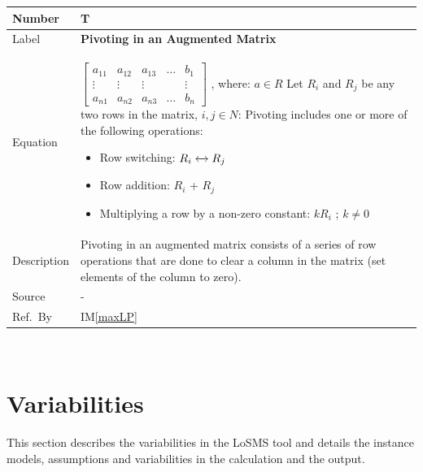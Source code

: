 \documentclass[12pt]{article}
\newcommand{\colAwidth}{0.13\textwidth}
\newcommand{\colBwidth}{0.82\textwidth}
\newcounter{theorynum} %
\newcommand{\iref}[1]{IM\ref{#1}}
\newcommand{\famname}{LoSMS} %
\begin{document}
\noindent
\begin{minipage}{\textwidth}
	\renewcommand*{\arraystretch}{1.5}
	\begin{tabular}{| p{\colAwidth} | p{\colBwidth}|}
		\hline
		\rowcolor[gray]{0.9}
		Number& T{theorynum}\thetheorynum \label{T_pivoting}\\
		\hline
		Label&\bf Pivoting in an Augmented Matrix\\
		\hline
		Equation&$\begin{bmatrix}
		a_{11} & a_{12} & a_{13} & \dots & b_{1}\\
		\vdots & \vdots & \vdots & &\vdots\\
		a_{n1} & a_{n2} & a_{n3} & \dots & b_{n}	
		\end{bmatrix}$ , where: $a \in R$ \newline \newline
		Let $R_i$ and $R_j$ be any two rows in the matrix, $i, j \in N$: 
		\newline
		Pivoting includes one or more of the following operations:
		\begin{itemize}
			\item Row switching: $R_i \xleftrightarrow{} R_j$
			
			\item Row addition: $R_i$ + $R_j$
			
			\item Multiplying a row by a non-zero constant: $kR_i$ ; 
			$k \neq 0$
		\end{itemize} \\
		\hline
		Description & 
		Pivoting in an augmented matrix consists of a series of row operations 
		that are done to clear a column in the matrix (set elements of the 
		column to zero).\\
		\hline
		Source & -\\
		\hline
		Ref.\ By & \iref{maxLP}\\
		\hline
	\end{tabular}
\end{minipage}\\

\section{Variabilities} \label{Sec_Variabilities} 

This section describes the variabilities in the \famname{} tool and details the 
instance models, assumptions and variabilities in the calculation and the 
output.
\end{document}
